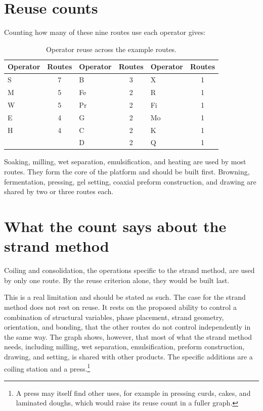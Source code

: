 \documentclass[11pt,openany]{book}
\theoremstyle{definition}
\begin{document}
\section{Reuse counts}

Counting how many of these nine routes use each operator gives:

\begin{table}[h]
\centering
\begin{tabular}{@{}lc@{\qquad}lc@{\qquad}lc@{}}
\toprule
Operator & Routes & Operator & Routes & Operator & Routes \\
\midrule
S & 7 & B & 3 & X & 1 \\
M & 5 & Fe & 2 & R & 1 \\
W & 5 & Pr & 2 & Fi & 1 \\
E & 4 & G & 2 & Mo & 1 \\
H & 4 & C & 2 & K & 1 \\
 &  & D & 2 & Q & 1 \\
\bottomrule
\end{tabular}
\caption{Operator reuse across the example routes.}
\end{table}

Soaking, milling, wet separation, emulsification, and heating are used by most routes. They form the core of the platform and should be built first. Browning, fermentation, pressing, gel setting, coaxial preform construction, and drawing are shared by two or three routes each.

\section{What the count says about the strand method}

Coiling and consolidation, the operations specific to the strand method, are used by only one route. By the reuse criterion alone, they would be built last.

This is a real limitation and should be stated as such. The case for the strand method does not rest on reuse. It rests on the proposed ability to control a combination of structural variables, phase placement, strand geometry, orientation, and bonding, that the other routes do not control independently in the same way. The graph shows, however, that most of what the strand method needs, including milling, wet separation, emulsification, preform construction, drawing, and setting, is shared with other products. The specific additions are a coiling station and a press.\footnote{A press may itself find other uses, for example in pressing curds, cakes, and laminated doughs, which would raise its reuse count in a fuller graph.}
\end{document}
